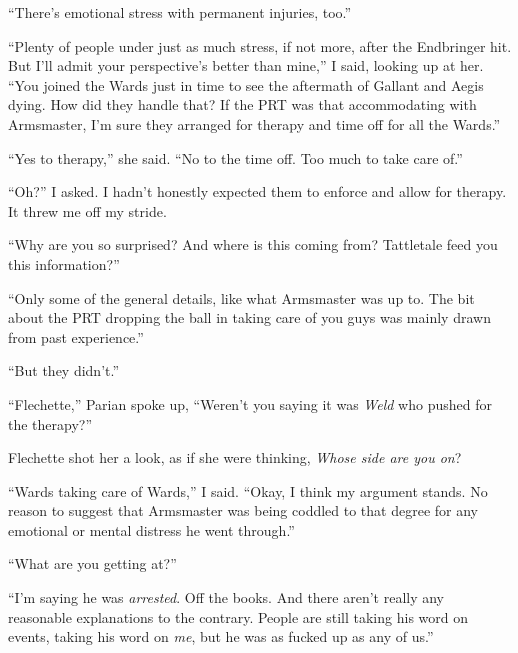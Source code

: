 ``There's emotional stress with permanent injuries, too.''



``Plenty of people under just as much stress, if not more, after the Endbringer hit.  But I'll admit your perspective's better than mine,'' I said, looking up at her.  ``You joined the Wards just in time to see the aftermath of Gallant and Aegis dying.  How did they handle that?  If the PRT was that accommodating with Armsmaster, I'm sure they arranged for therapy and time off for all the Wards.''



``Yes to therapy,'' she said.  ``No to the time off.  Too much to take care of.''



``Oh?'' I asked.  I hadn't honestly expected them to enforce and allow for therapy.  It threw me off my stride.



``Why are you so surprised?  And where is this coming from?  Tattletale feed you this information?''



``Only some of the general details, like what Armsmaster was up to.  The bit about the PRT dropping the ball in taking care of you guys was mainly drawn from past experience.''



``But they didn't.''



``Flechette,'' Parian spoke up, ``Weren't you saying it was \emph{Weld} who pushed for the therapy?''



Flechette shot her a look, as if she were thinking, \emph{Whose side are you on}?



``Wards taking care of Wards,'' I said.  ``Okay, I think my argument stands.  No reason to suggest that Armsmaster was being coddled to that degree for any emotional or mental distress he went through.''



``What are you getting at?''



``I'm saying he was \emph{arrested}.  Off the books.  And there aren't really any reasonable explanations to the contrary.  People are still taking his word on events, taking his word on \emph{me}, but he was as fucked up as any of us.''



